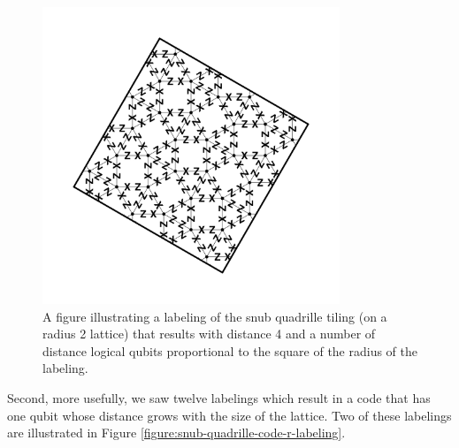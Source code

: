 \documentclass[12pt]{amsbook}
\theoremstyle{plain}
\theoremstyle{definition}
\theoremstyle{remark}
\begin{document}
\begin{figure}
\includegraphics[width=3.5in]{images/snub-quadrille-code-4-labeling} %
\caption{
\label{figure:snub-quadrille-code-4-labeling}
A figure illustrating a labeling of the snub quadrille tiling (on a radius 2 lattice) that results with distance 4 and a number of distance logical qubits proportional to the square of the radius of the labeling.
}
\end{figure}

Second, more usefully, we saw twelve labelings which result in a code that has one qubit whose distance grows with the size of the lattice.  Two of these labelings are illustrated in Figure \ref{figure:snub-quadrille-code-r-labeling}.
\end{document}
